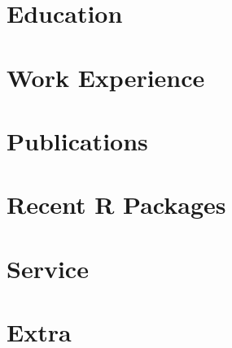 \documentclass[letterpaper, 10.5pt, sans]{moderncv}
\begin{document}
\makecvtitle

\vspace*{-35pt}

\section{Education}







\vspace{-10pt}
\section{Work Experience}


\vspace{-10pt}
\vspace{-3pt}










\vspace{-5pt}


\section{Publications}
\vspace{-5pt}







\newpage


\section{Recent R Packages}











% 

\section{Service}










\vspace{-5pt}
\section{Extra}

\vspace{-5pt}


\end{document}
